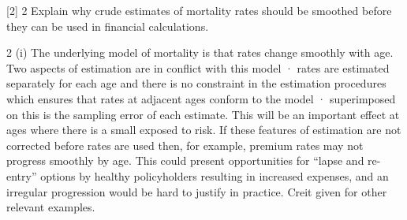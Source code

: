 \documentclass[a4paper,12pt]{article}
\begin{document}
[2]
2 Explain why crude estimates of mortality rates should be smoothed before
they can be used in financial calculations.





2
(i)
The underlying model of mortality is that rates change smoothly with age.
Two aspects of estimation are in conflict with this model
· rates are estimated separately for each age and there is no constraint
in the estimation procedures which ensures that rates at adjacent ages
conform to the model
· superimposed on this is the sampling error of each estimate. This will
be an important effect at ages where there is a small exposed to risk.
If these features of estimation are not corrected before rates are used
then, for example, premium rates may not progress smoothly by age.
This could present opportunities for “lapse and re-entry” options by
healthy policyholders resulting in increased expenses, and an irregular
progression would be hard to justify in practice.
Creit given for other relevant examples.
\end{document}
